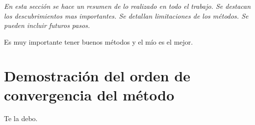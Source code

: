 \documentclass[12pt,a4]{article} %
\begin{document}
\begin{multicols}{2}
\textit{En esta sección se hace un resumen de lo realizado en todo el trabajo. Se destacan los descubrimientos mas importantes. Se detallan limitaciones de los métodos. Se pueden incluir futuros pasos. }

Es muy importante tener buenos métodos y el mío es el mejor.

\appendix
\section{Demostración del orden de convergencia del método}
\label{demostracion}

Te la debo.

\printbibliography
\end{multicols}
\end{document}
